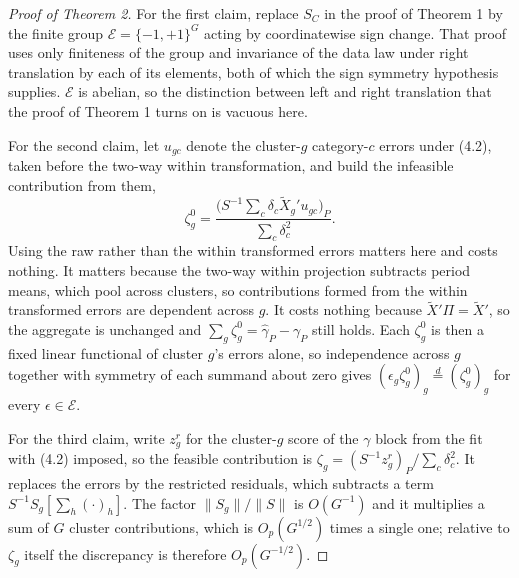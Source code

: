 \documentclass[12pt]{article}
\theoremstyle{definition}
\numberwithin{equation}{section}
\begin{document}
\begin{proof}[Proof of Theorem 2]
For the first claim, replace $S_C$ in the proof of Theorem 1 by
the finite group $\mathcal{E} = \{-1,+1\}^G$ acting by coordinatewise sign
change. That proof uses only finiteness of the group and invariance of the data
law under right translation by each of its elements, both of which the sign
symmetry hypothesis supplies. $\mathcal{E}$ is abelian, so the distinction
between left and right translation that the proof of Theorem 1
turns on is vacuous here.

For the second claim, let $u_{gc}$ denote the cluster-$g$ category-$c$ errors
under (4.2), taken before the two-way within transformation, and build
the infeasible contribution from them,
$$
\zeta^0_g = \frac{\big(S^{-1}\sum_c \delta_c \tilde{X}_g' u_{gc}\big)_P}
{\sum_c \delta_c^2} .
$$
Using the raw rather than the within transformed errors matters here and costs
nothing. It matters because the two-way within projection subtracts period
means, which pool across clusters, so contributions formed from the
within transformed errors are dependent across $g$. It costs
nothing because $\tilde{X}'\Pi = \tilde{X}'$, so the aggregate is unchanged and
$\sum_g \zeta^0_g = \hat{\gamma}_P - \gamma_P$ still holds. Each $\zeta^0_g$ is
then a fixed linear functional of cluster $g$'s errors alone, so independence
across $g$ together with symmetry of each summand about zero gives
$(\epsilon_g \zeta^0_g)_g \overset{d}{=} (\zeta^0_g)_g$ for every
$\epsilon \in \mathcal{E}$.

For the third claim, write $z^r_g$ for the cluster-$g$ score of the $\gamma$
block from the fit with (4.2) imposed, so the feasible contribution is
$\zeta_g = (S^{-1}z^r_g)_P/\sum_c \delta_c^2$. It replaces the errors by the
restricted residuals, which subtracts a term $S^{-1}S_g[\sum_h(\cdot)_h]$. The
factor $\|S_g\|/\|S\|$ is $O(G^{-1})$ and it multiplies a sum of $G$ cluster
contributions, which is $O_p(G^{1/2})$ times a single one; relative to $\zeta_g$
itself the discrepancy is therefore $O_p(G^{-1/2})$.


\end{proof}
\end{document}
